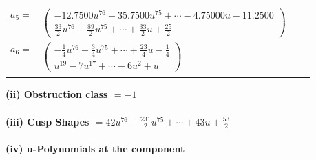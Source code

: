\documentclass[1p]{elsarticle_modified}
\theoremstyle{definition}
\begin{document}
\begin{tabular}{m{7pt} m{180pt} m{7pt} m{180pt} }
\flushright $a_{5}=$&$\begin{pmatrix}-12.7500 u^{76}-35.7500 u^{75}+\cdots-4.75000 u-11.2500\\\frac{33}{2} u^{76}+\frac{89}{2} u^{75}+\cdots+\frac{33}{2} u+\frac{25}{2}\end{pmatrix}$ \\
\flushright $a_{6}=$&$\begin{pmatrix}-\frac{1}{4} u^{76}-\frac{3}{4} u^{75}+\cdots+\frac{23}{4} u-\frac{1}{4}\\u^{19}-7 u^{17}+\cdots-6 u^2+u\end{pmatrix}$\\&\end{tabular}
\flushleft \textbf{(ii) Obstruction class $= -1$}\\~\\
\flushleft \textbf{(iii) Cusp Shapes $= 42 u^{76}+\frac{231}{2} u^{75}+\cdots+43 u+\frac{53}{2}$}\\~\\
\newpage\renewcommand{\arraystretch}{1}
\flushleft \textbf{(iv) u-Polynomials at the component}\newline \\
\end{document}

